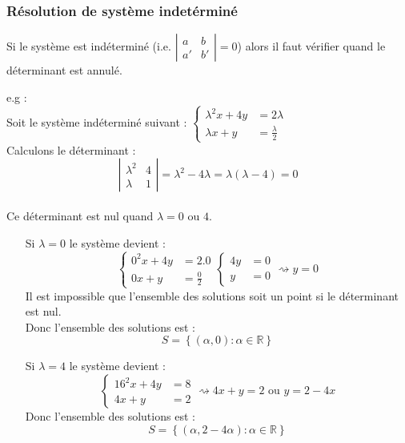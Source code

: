 \documentclass[a4paper,10pt]{report}
\begin{document}
\subsubsection{Résolution de système indetérminé}
Si le système est indéterminé (i.e. $\left| \begin{matrix}
a & b \\
a' & b'
\end{matrix} \right| = 0$) alors il faut vérifier quand le déterminant est annulé.

e.g :
\\Soit le système indéterminé suivant : $\left\{\begin{array}{ll}
 \lambda^2 x+4y & = 2\lambda\\
 \lambda x+ y & = \frac{\lambda}{2}
 \end{array}\right.$
\\
Calculons le déterminant :
$$\left| \begin{matrix}
\lambda^2 & 4 \\
\lambda & 1
\end{matrix} \right| = \lambda^2 - 4\lambda = \lambda(\lambda-4)=0$$
\\
Ce déterminant est nul quand $\lambda = 0 \mbox{ ou } 4$.

\begin{itemize}
\item[Si $\lambda = 0$ le système devient :]{
$$\left\{\begin{array}{ll}
 0^2 x+4y & = 2.0\\
 0 x+ y & = \frac{0}{2}
 \end{array}\right.\left\{\begin{array}{ll}
 4y & = 0\\
 y & = 0
 \end{array}\right. \rightsquigarrow y = 0$$
Il est impossible que l'ensemble des solutions soit un point si le déterminant est nul.
\\Donc l'ensemble des solutions est :
$$S=\left\lbrace (\alpha,0):\alpha \in \mathbb{R}\right\rbrace $$
}
\item[Si $\lambda = 4$ le système devient :]{
$$\left\{\begin{array}{ll}
 16^2 x+4y & = 8\\
 4x+ y & = 2
 \end{array}\right. \rightsquigarrow 4x + y = 2 \mbox{ ou } y=2-4x$$
Donc l'ensemble des solutions est :
$$S=\left\lbrace (\alpha,2-4\alpha):\alpha \in \mathbb{R}\right\rbrace $$
}
\end{itemize}
\end{document}
